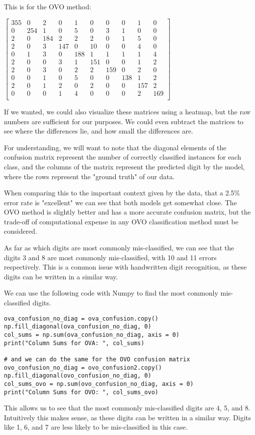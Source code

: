 \documentclass[12pt, letterpaper]{article}
\begin{document}
This is for the OVO method:
\bigskip

$\begin{bmatrix}
  355 & 0 & 2 & 0 & 1 & 0 & 0 & 0 & 1 & 0 \\
  0 & 254 & 1 & 0 & 5 & 0 & 3 & 1 & 0 & 0 \\
  2 & 0 & 184 & 2 & 2 & 2 & 0 & 1 & 5 & 0 \\
  2 & 0 & 3 & 147 & 0 & 10 & 0 & 0 & 4 & 0 \\
  0 & 1 & 3 & 0 & 188 & 1 & 1 & 1 & 1 & 4 \\
  2 & 0 & 0 & 3 & 1 & 151 & 0 & 0 & 1 & 2 \\
  2 & 0 & 3 & 0 & 2 & 2 & 159 & 0 & 2 & 0 \\
  0 & 0 & 1 & 0 & 5 & 0 & 0 & 138 & 1 & 2 \\
  2 & 0 & 1 & 2 & 0 & 2 & 0 & 0 & 157 & 2 \\
  0 & 0 & 0 & 1 & 4 & 0 & 0 & 0 & 2 & 169 \\
\end{bmatrix}$
\bigskip

If we wanted, we could also visualize these matrices using a heatmap, but the raw numbers are sufficient for our purposes. We could even subtract the matrices to see where the differences lie, and how small the differences are.  

For understanding, we will want to note that the diagonal elements of the confusion matrix represent the number of correctly classified instances for each class, and the columns of the matrix represent the predicted digit by the model, where the rows represent the "ground truth" of our data. 

When comparing this to the important context given by the data, that a 2.5\% error rate is "excellent" we can see that both models get somewhat close. The OVO method is slightly better and has a more accurate confusion matrix, but the trade-off of computational expense in any OVO classification method must be considered. 

As far as which digits are most commonly mis-classified, we can see that the digits 3 and 8 are most commonly mis-classified, with 10 and 11 errors respectively. This is a common issue with handwritten digit recognition, as these digits can be written in a similar way.  

We can use the following code with Numpy to find the most commonly mis-classified digits. 

\begin{verbatim} 
ova_confusion_no_diag = ova_confusion.copy()
np.fill_diagonal(ova_confusion_no_diag, 0) 
col_sums = np.sum(ova_confusion_no_diag, axis = 0)
print("Column Sums for OVA: ", col_sums) 

# and we can do the same for the OVO confusion matrix 
ovo_confusion_no_diag = ovo_confusion2.copy()
np.fill_diagonal(ovo_confusion_no_diag, 0)
col_sums_ovo = np.sum(ovo_confusion_no_diag, axis = 0)
print("Column Sums for OVO: ", col_sums_ovo)
\end{verbatim} 

This allows us to see that the most commonly mis-classified digits are 4, 5, and 8. Intuitively this makes sense, as these digits can be written in a similar way. Digits like 1, 6, and 7 are less likely to be mis-classified in this case. 
\end{document}
